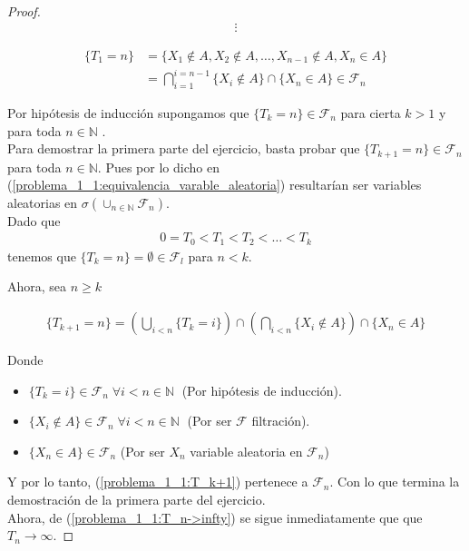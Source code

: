 \begin{proof}
	\begin{align*}
		\vdots
	\end{align*}
	
	\begin{align}
			\{T_1 = n\} 	&=	\{ X_1 \not\in A, X_2 \not\in A, \dots, X_{n-1} \not\in A, X_n \in A \} \\
							&= 	\bigcap_{i=1}^{i=n-1} \{ X_i \not\in A \} \cap \{X_n \in A \} \in \mathscr{F}_n
	\end{align} 
 
	Por hipótesis de inducción supongamos que ${\{T_k = n\} \in \mathscr{F}_n}$ para cierta ${k>1}$ 
	y para toda ${n \in \mathbb{N}}$ . \\

	Para demostrar la primera parte del ejercicio, basta probar que ${\{T_{k+1} = n\} \in \mathscr{F}_n}$ para 
	toda ${n \in \mathbb{N}}$. Pues por lo dicho en (\ref{problema_1_1:equivalencia_varable_aleatoria}) resultarían ser 
	variables aleatorias en ${\sigma(\cup_{n \in \mathbb{N}} \mathscr{F}_n)}$.
	\\
	
	Dado que 
	\begin{align}\label{problema_1_1:T_n->infty}
		0=T_0<T_1<T_2<\dots<T_k
	\end{align}  
	tenemos que ${\{ T_k = n\} = \emptyset \in \mathscr{F}_l}$ para ${n < k}$. 
	
	Ahora, sea ${n \geq k}$
	
	\begin{align}\label{problema_1_1:T_k+1}
		\{ T_{k+1} = n\} = 
		\left( \bigcup_{i < n } \{T_k = i \} \right) 
		\cap 
		\left( \bigcap_{i < n} \{ X_i \not\in A \} \right)
		\cap
		\{ X_n \in A\}
	\end{align}
	
	
	Donde 
	\begin{itemize}
		\item	 ${\{ T_k = i\} \in \mathscr{F}_n \; \forall i < n \in \mathbb{N} \; }$ (Por hipótesis de inducción).	
		\item	 ${\{ X_i \not \in A\} \in \mathscr{F}_n \; \forall i < n \in \mathbb{N} \;}$ (Por ser ${\mathscr{F}}$ filtración).
		\item ${\{ X_n \in A\} \in \mathscr{F}_n}$ (Por ser ${X_n}$ variable aleatoria en ${\mathscr{F}_n}$)	
	\end{itemize}
	
	Y por lo tanto, (\ref{problema_1_1:T_k+1}) pertenece a ${\mathscr{F}_n}$. Con lo que termina la demostración de la primera parte del ejercicio.\\
	
	Ahora, de (\ref{problema_1_1:T_n->infty}) se sigue inmediatamente que que ${T_n \rightarrow \infty}$.
\end{proof}